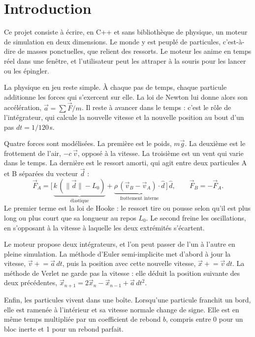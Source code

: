 \documentclass[11pt,a4paper]{article}
\renewcommand{\vec}[1]{\overset{\scriptscriptstyle\rightarrow}{#1}}
\begin{document}
\section{Introduction}

Ce projet consiste à écrire, en C++ et sans bibliothèque de physique, un moteur de simulation en deux
dimensions. Le monde y est peuplé de particules, c'est-à-dire de masses ponctuelles, que relient des
ressorts. Le moteur les anime en temps réel dans une fenêtre, et l'utilisateur peut les attraper à la
souris pour les lancer ou les épingler.

La physique en jeu reste simple. À chaque pas de temps, chaque particule additionne les forces qui
s'exercent sur elle. La loi de Newton lui donne alors son accélération, $\vec a = \sum \vec F / m$.
Il reste à avancer dans le temps : c'est le rôle de l'intégrateur, qui calcule la nouvelle vitesse et
la nouvelle position au bout d'un pas $dt = 1/120$\,s.

Quatre forces sont modélisées. La première est le poids, $m\vec g$. La deuxième est le frottement de
l'air, $-c\,\vec v$, opposé à la vitesse. La troisième est un vent qui varie dans le temps. La dernière est le ressort amorti, qui agit entre deux particules
A et B séparées du vecteur $\vec d$ :
\[
  \vec F_A = \Big[\,\underbrace{k\,(\lVert\vec d\rVert - L_0)}_{\text{élastique}}
    + \underbrace{\rho\,(\vec v_B - \vec v_A)\cdot\hat d}_{\text{frottement interne}}\,\Big]\,\hat d,
  \qquad \vec F_B = -\vec F_A .
\]
Le premier terme est la loi de Hooke : le ressort tire ou pousse selon qu'il est plus long ou plus
court que sa longueur au repos $L_0$. Le second freine les oscillations, en s'opposant à la vitesse à
laquelle les deux extrémités s'écartent.

Le moteur propose deux intégrateurs, et l'on peut passer de l'un à l'autre en pleine simulation. La
méthode d'Euler semi-implicite met d'abord à jour la vitesse, $\vec v \mathrel{+}= \vec a\,dt$, puis
la position avec cette nouvelle vitesse, $\vec x \mathrel{+}= \vec v\,dt$. La méthode de Verlet ne
garde pas la vitesse : elle déduit la position suivante des deux précédentes,
$\vec x_{n+1} = 2\vec x_n - \vec x_{n-1} + \vec a\,dt^2$.

Enfin, les particules vivent dans une boîte. Lorsqu'une particule franchit un bord, elle est ramenée à
l'intérieur et sa vitesse normale change de signe. Elle est en même temps multipliée par un
coefficient de rebond $b$, compris entre 0 pour un bloc inerte et 1 pour un rebond parfait.
\end{document}
